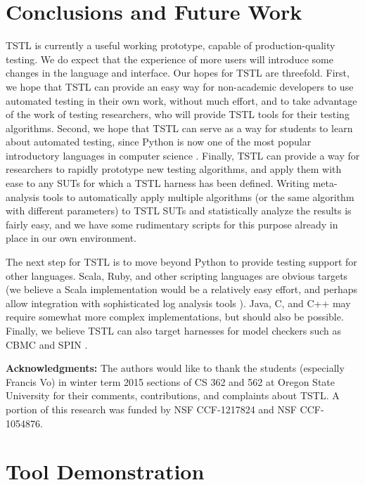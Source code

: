 \documentclass{sig-alternate}
\begin{document}
\section{Conclusions and Future Work}

TSTL is currently a useful working prototype, capable of
production-quality testing.  We do expect that the experience of more
users will introduce some changes in the language and interface.  Our
hopes for TSTL are threefold.  First, we hope that TSTL can provide an
easy way for non-academic developers to use automated testing in their
own work, without much effort, and to take advantage of the work of
testing researchers, who will provide TSTL tools for their testing
algorithms.  Second, we hope that TSTL can serve as a way for students
to learn about automated testing, since Python is now one of the most
popular introductory languages in computer science \cite{PythonPop}.
Finally, TSTL can provide a way for researchers to rapidly prototype
new testing algorithms, and apply them with ease to any SUTs for which
a TSTL harness has been defined.  Writing meta-analysis tools to
automatically apply multiple algorithms (or the same algorithm with
different parameters) to TSTL SUTs and statistically analyze the
results is fairly easy, and we have some rudimentary scripts for this
purpose already in place in our own environment.

The next step for TSTL is to move beyond Python to provide testing
support for other languages.  Scala, Ruby, and other scripting
languages are obvious targets (we believe a Scala implementation would
be a relatively easy effort, and perhaps allow integration with
sophisticated log analysis tools \cite{KlausTool}).  Java, C, and C++
may require somewhat more complex implementations, but should also be
possible.  Finally, we believe TSTL can also target harnesses for
model checkers such as CBMC \cite{CBMCp} and SPIN \cite{SPIN}.

{\bf Acknowledgments:} The authors would like to thank the students
  (especially Francis Vo) in winter term 2015 sections of CS 362 and
  562 at Oregon State University for their comments, contributions,
  and complaints about TSTL.  A portion of this research was funded by
  NSF CCF-1217824 and NSF CCF-1054876.




\newpage

\appendix

\section{Tool Demonstration}
\end{document}
